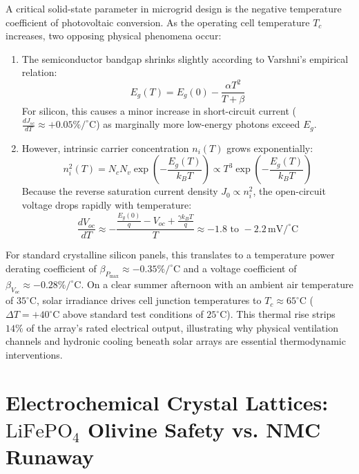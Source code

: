 A critical solid-state parameter in microgrid design is the negative temperature coefficient of photovoltaic conversion. As the operating cell temperature $T_c$ increases, two opposing physical phenomena occur:
\begin{enumerate}
    \item The semiconductor bandgap shrinks slightly according to Varshni's empirical relation:
    \begin{equation}
    E_g(T) = E_g(0) - \frac{\alpha T^2}{T + \beta}
    \label{eq:varshni_equation}
    \end{equation}
    For silicon, this causes a minor increase in short-circuit current ($\frac{dJ_{sc}}{dT} \approx +0.05\%/^\circ\mathrm{C}$) as marginally more low-energy photons exceed $E_g$.
    \item However, intrinsic carrier concentration $n_i(T)$ grows exponentially:
    \begin{equation}
    n_i^2(T) = N_c N_v \exp\left( -\frac{E_g(T)}{k_B T} \right) \propto T^3 \exp\left( -\frac{E_g(T)}{k_B T} \right)
    \label{eq:intrinsic_density_temp}
    \end{equation}
    Because the reverse saturation current density $J_0 \propto n_i^2$, the open-circuit voltage drops rapidly with temperature:
    \begin{equation}
    \frac{dV_{oc}}{dT} \approx -\frac{\frac{E_g(0)}{q} - V_{oc} + \frac{\gamma k_B T}{q}}{T} \approx -1.8 \text{ to } -2.2\,\mathrm{mV/^\circ C}
    \label{eq:dvoc_dt}
    \end{equation}
\end{enumerate}

For standard crystalline silicon panels, this translates to a temperature power derating coefficient of $\beta_{P_{\max}} \approx -0.35\%/^\circ\mathrm{C}$ and a voltage coefficient of $\beta_{V_{oc}} \approx -0.28\%/^\circ\mathrm{C}$. On a clear summer afternoon with an ambient air temperature of $35^\circ\mathrm{C}$, solar irradiance drives cell junction temperatures to $T_c \approx 65^\circ\mathrm{C}$ ($\Delta T = +40^\circ\mathrm{C}$ above standard test conditions of $25^\circ\mathrm{C}$). This thermal rise strips $14\%$ of the array's rated electrical output, illustrating why physical ventilation channels and hydronic cooling beneath solar arrays are essential thermodynamic interventions.

\section{Electrochemical Crystal Lattices: \texorpdfstring{$\mathrm{LiFePO}_4$}{LiFePO4} Olivine Safety vs. NMC Runaway}

